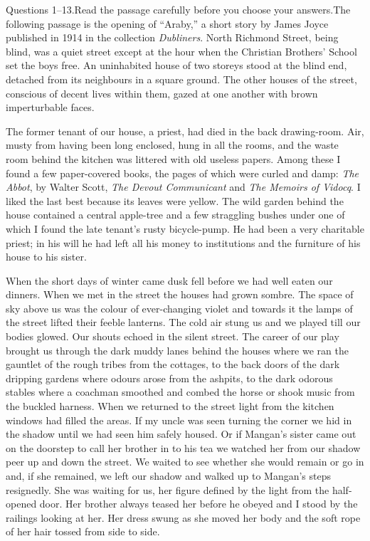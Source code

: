 \documentclass[11pt]{article}
\begin{document}
\begin{passage}{Questions 1--13.\quad Read the passage carefully before you choose your answers.}{The following passage is the opening of ``Araby,'' a short story by James Joyce published in 1914 in the collection \emph{Dubliners}.}
\pp North Richmond Street, being blind, was a quiet street except at the hour when the Christian Brothers' School set the boys free. An uninhabited house of two storeys stood at the blind end, detached from its neighbours in a square ground. The other houses of the street, conscious of decent lives within them, gazed at one another with brown imperturbable faces.

\pp The former tenant of our house, a priest, had died in the back drawing-room. Air, musty from having been long enclosed, hung in all the rooms, and the waste room behind the kitchen was littered with old useless papers. Among these I found a few paper-covered books, the pages of which were curled and damp: \emph{The Abbot}, by Walter Scott, \emph{The Devout Communicant} and \emph{The Memoirs of Vidocq}. I liked the last best because its leaves were yellow. The wild garden behind the house contained a central apple-tree and a few straggling bushes under one of which I found the late tenant's rusty bicycle-pump. He had been a very charitable priest; in his will he had left all his money to institutions and the furniture of his house to his sister.

\pp When the short days of winter came dusk fell before we had well eaten our dinners. When we met in the street the houses had grown sombre. The space of sky above us was the colour of ever-changing violet and towards it the lamps of the street lifted their feeble lanterns. The cold air stung us and we played till our bodies glowed. Our shouts echoed in the silent street. The career of our play brought us through the dark muddy lanes behind the houses where we ran the gauntlet of the rough tribes from the cottages, to the back doors of the dark dripping gardens where odours arose from the ashpits, to the dark odorous stables where a coachman smoothed and combed the horse or shook music from the buckled harness. When we returned to the street light from the kitchen windows had filled the areas. If my uncle was seen turning the corner we hid in the shadow until we had seen him safely housed. Or if Mangan's sister came out on the doorstep to call her brother in to his tea we watched her from our shadow peer up and down the street. We waited to see whether she would remain or go in and, if she remained, we left our shadow and walked up to Mangan's steps resignedly. She was waiting for us, her figure defined by the light from the half-opened door. Her brother always teased her before he obeyed and I stood by the railings looking at her. Her dress swung as she moved her body and the soft rope of her hair tossed from side to side.


\end{passage}
\end{document}
